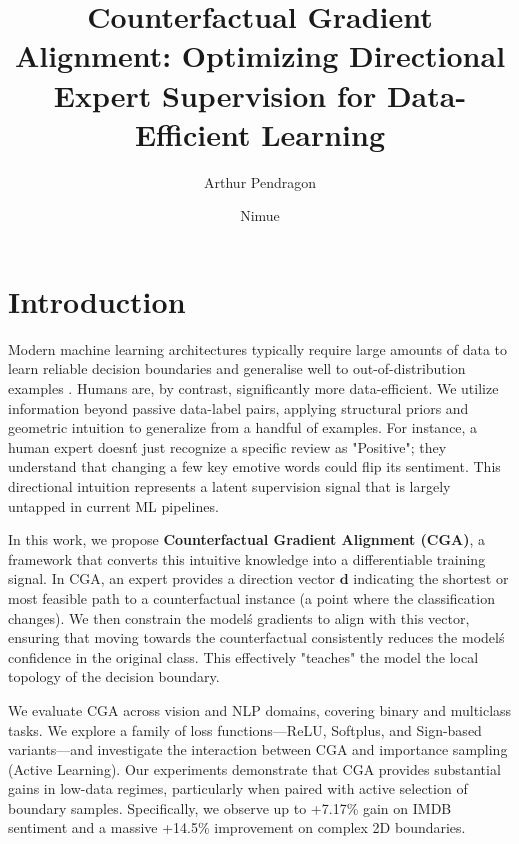 \documentclass[sigconf,anonymous]{aamas}
\title[Counterfactual Gradient Alignment]{Counterfactual Gradient Alignment: Optimizing Directional Expert Supervision for Data-Efficient Learning}
\author{Arthur Pendragon}
\affiliation{
  \institution{Camelot Castle}
  \city{Camelot}
  \country{United Kingdom}}
\author{Nimue}
\affiliation{
  \institution{The Lady's Lake}
  \city{Avalon}
  \country{United Kingdom}}
\begin{document}

\pagestyle{fancy}
\fancyhead{}


\maketitle 


\section{Introduction}
Modern machine learning architectures typically require large amounts of data to learn reliable decision boundaries and generalise well to out-of-distribution examples \cite{hand_classifier, Challen231, souza2020challenges}. Humans are, by contrast, significantly more data-efficient. We utilize information beyond passive data-label pairs, applying structural priors and geometric intuition to generalize from a handful of examples. For instance, a human expert doesn\'t just recognize a specific review as "Positive"; they understand that changing a few key emotive words could flip its sentiment. This directional intuition represents a latent supervision signal that is largely untapped in current ML pipelines.

In this work, we propose \textbf{Counterfactual Gradient Alignment (CGA)}, a framework that converts this intuitive knowledge into a differentiable training signal. In CGA, an expert provides a direction vector $\mathbf{d}$ indicating the shortest or most feasible path to a counterfactual instance (a point where the classification changes). We then constrain the model\'s gradients to align with this vector, ensuring that moving towards the counterfactual consistently reduces the model\'s confidence in the original class. This effectively "teaches" the model the local topology of the decision boundary.

We evaluate CGA across vision and NLP domains, covering binary and multiclass tasks. We explore a family of loss functions---ReLU, Softplus, and Sign-based variants---and investigate the interaction between CGA and importance sampling (Active Learning). Our experiments demonstrate that CGA provides substantial gains in low-data regimes, particularly when paired with active selection of boundary samples. Specifically, we observe up to +7.17\% gain on IMDB sentiment and a massive +14.5\% improvement on complex 2D boundaries.
\end{document}
